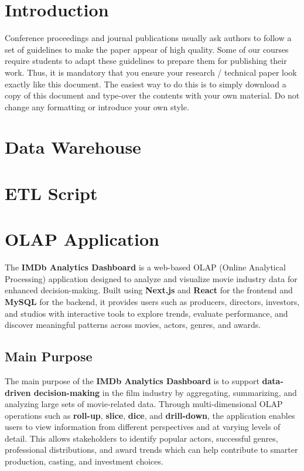 \documentclass[sigconf, pbalance]{acmart}
\begin{document}
\section{Introduction}

Conference proceedings and journal publications usually ask authors to follow a set of guidelines to make the paper appear of high quality. Some of our courses require students to adapt these guidelines to prepare them for publishing their work. Thus, it is mandatory that you ensure your research / technical paper look exactly like this document. The easiest way to do this is to simply download a copy of this document and type-over the contents with your own material. Do not change any formatting or introduce your own style.


\section{Data Warehouse}

\section{ETL Script}

\section{OLAP Application}

The \textbf{IMDb Analytics Dashboard} is a web-based OLAP (Online Analytical Processing) application designed to analyze and visualize movie industry data for enhanced decision-making. Built using \textbf{Next.js} and \textbf{React} for the frontend and \textbf{MySQL} for the backend, it provides users such as producers, directors, investors, and studios with interactive tools to explore trends, evaluate performance, and discover meaningful patterns across movies, actors, genres, and awards.

\subsection{Main Purpose}

The main purpose of the \textbf{IMDb Analytics Dashboard} is to support \textbf{data-driven decision-making} in the film industry by aggregating, summarizing, and analyzing large sets of movie-related data. Through multi-dimensional OLAP operations such as \textbf{roll-up}, \textbf{slice}, \textbf{dice}, and \textbf{drill-down}, the application enables users to view information from different perspectives and at varying levels of detail. This allows stakeholders to identify popular actors, successful genres, professional distributions, and award trends which can help contribute to smarter production, casting, and investment choices.
\end{document}
